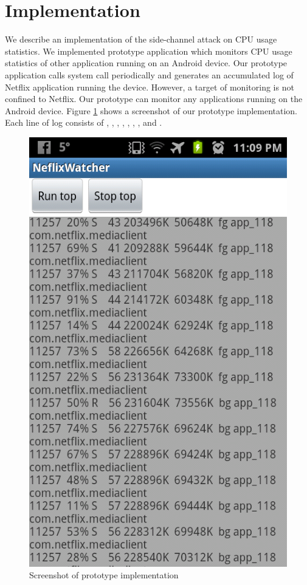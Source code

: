 \section{Implementation}
\label{sec:implementation} 

We describe an implementation of the side-channel attack on CPU usage statistics. 
We implemented prototype application which monitors CPU usage statistics of other application running on an Android device.
Our prototype application calls  system call periodically and generates an accumulated log of Netflix application running the device. 
However, a target of monitoring is not confined to Netflix.
Our prototype can monitor any applications running on the Android device. 
Figure \ref{fig:prototype_screenshot} shows a screenshot of our prototype implementation. 
Each line of log consists of , , , , , , ,  and . 

\begin{figure}[!h]
\centering
\includegraphics[scale=0.20]{Figures/netflix_watcher_screenshot2}
\caption{Screenshot of prototype implementation}
\label{fig:prototype_screenshot}
\end{figure}

